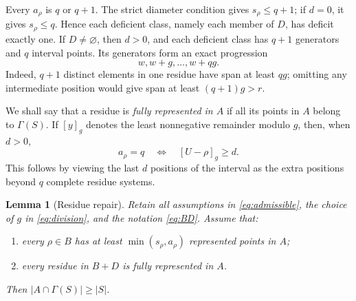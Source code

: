 \documentclass[11pt]{article}
\newtheorem{lemma}[theorem]{Lemma}
\theoremstyle{definition}
\theoremstyle{remark}
\newcommand{\Ga}{\Gamma}
\begin{document}
Every $a_\rho$ is $q$ or $q+1$. The strict diameter condition gives
$s_\rho\leq q+1$; if $d=0$, it gives $s_\rho\leq q$. Hence each
deficient class, namely each member of $D$, has deficit exactly one.
If $D\ne\varnothing$, then $d>0$, and each deficient class has $q+1$
generators and $q$ interval points. Its generators form an exact
progression
\begin{equation}\label{eq:deficientAP}
 w,w+g,\ldots,w+qg.
\end{equation}
Indeed, $q+1$ distinct elements in one residue have span at least $qg$;
omitting any intermediate position would give span at least
$(q+1)g>r$.

We shall say that a residue is \emph{fully represented in $A$} if all
its points in $A$ belong to $\Ga(S)$. If $[y]_g$ denotes the least
nonnegative remainder modulo $g$, then, when $d>0$,
\begin{equation}\label{eq:short-class}
 a_\rho=q\quad\Longleftrightarrow\quad [U-\rho]_g\geq d.
\end{equation}
This follows by viewing the last $d$ positions of the interval as the
extra positions beyond $q$ complete residue systems.

\begin{lemma}[Residue repair]\label{lem:repair}
Retain all assumptions in \eqref{eq:admissible}, the choice of $g$
in \eqref{eq:division}, and the notation \eqref{eq:BD}. Assume that:
\begin{enumerate}
 \item every $\rho\in B$ has at least
 $\min(s_\rho,a_\rho)$ represented points in $A$;
 \item every residue in $B+D$ is fully represented in $A$.
\end{enumerate}
Then $|A\cap\Ga(S)|\geq |S|$.
\end{lemma}
\end{document}
